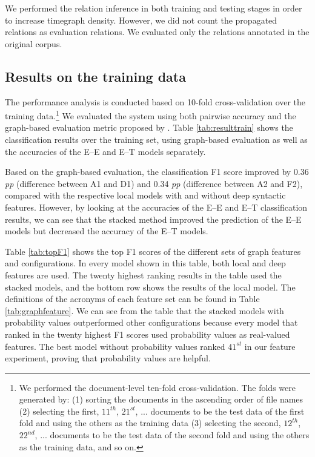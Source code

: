 \documentclass[english]{jnlp_1.4}
\begin{document}
We performed the relation inference in both training and testing stages in order to increase timegraph density.  
However, we did not count the propagated relations as evaluation relations. 
We evaluated only the relations annotated in the original corpus.

\subsection{Results on the training data}

The performance analysis is conducted based on 10-fold cross-validation over the training data.\footnote{We performed the document-level ten-fold cross-validation. The folds were generated by: (1) sorting the documents in the ascending order of file names (2) selecting the first, $11^{th}$,  $21^{st}$, ... documents to be the test data of the first fold and using the others as the training data (3) selecting the second, $12^{th}$, $22^{nd}$, ... documents to be the test data of the second fold and using the others as the training data, and so on.}
We evaluated the system using both pairwise accuracy and the graph-based evaluation metric proposed by .
Table \ref{tab:resulttrain} shows the classification results over the training set, using graph-based evaluation as well as the accuracies of the E--E and E--T models separately.

\begin{table}[b]
\label{tab:resulttrain}

\end{table}

Based on the graph-based evaluation, the classification F1 score improved by 0.36 \textit{pp} (difference between A1 and D1) and 0.34 \textit{pp} (difference between A2 and F2), compared with the respective local models with and without deep syntactic features. 
However, by looking at the accuracies of the E--E and E--T classification results, we can see that the stacked method improved the prediction of the E--E models but decreased the accuracy of the E--T models.

Table \ref{tab:topF1} shows the top F1 scores of the different sets of graph features and configurations.
In every model shown in this table, both local and deep features are used.
The twenty highest ranking results in the table used the stacked models, and the bottom row shows the results of the local model.
The definitions of the acronyms of each feature set can be found in Table \ref{tab:graphfeature}.  
We can see from the table that the stacked models with probability values outperformed other configurations because every model that ranked in the twenty highest F1 scores used probability values as real-valued features.
The best model without probability values ranked $41^{st}$ in our feature experiment, proving that probability values are helpful.
\end{document}
